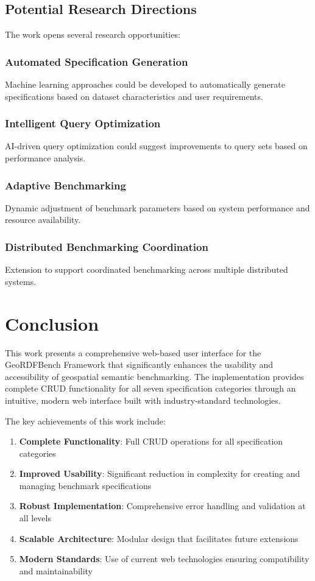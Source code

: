 \documentclass[11pt,a4paper]{article}
\begin{document}
\subsection{Potential Research Directions}

The work opens several research opportunities:

\subsubsection{Automated Specification Generation}
Machine learning approaches could be developed to automatically generate specifications based on dataset characteristics and user requirements.

\subsubsection{Intelligent Query Optimization}
AI-driven query optimization could suggest improvements to query sets based on performance analysis.

\subsubsection{Adaptive Benchmarking}
Dynamic adjustment of benchmark parameters based on system performance and resource availability.

\subsubsection{Distributed Benchmarking Coordination}
Extension to support coordinated benchmarking across multiple distributed systems.

\section{Conclusion}

This work presents a comprehensive web-based user interface for the GeoRDFBench Framework that significantly enhances the usability and accessibility of geospatial semantic benchmarking. The implementation provides complete CRUD functionality for all seven specification categories through an intuitive, modern web interface built with industry-standard technologies.

The key achievements of this work include:

\begin{enumerate}
    \item \textbf{Complete Functionality}: Full CRUD operations for all specification categories
    \item \textbf{Improved Usability}: Significant reduction in complexity for creating and managing benchmark specifications
    \item \textbf{Robust Implementation}: Comprehensive error handling and validation at all levels
    \item \textbf{Scalable Architecture}: Modular design that facilitates future extensions
    \item \textbf{Modern Standards}: Use of current web technologies ensuring compatibility and maintainability
\end{enumerate}
\end{document}
